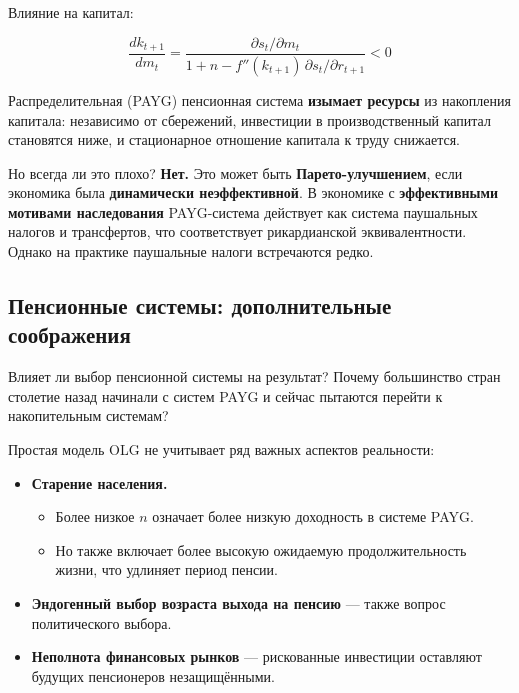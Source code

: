 \documentclass[10pt,a4paper]{article}
\begin{document}
Влияние на капитал:
\begin{formulabox}
\begin{equation}
\frac{dk_{t+1}}{dm_t} = \frac{\partial s_t/\partial m_t}{1+n-f''(k_{t+1})\,\partial s_t/\partial r_{t+1}} < 0 \tag{4.37}
\end{equation}
\end{formulabox}

\begin{intuition}
Распределительная (PAYG) пенсионная система \textbf{изымает ресурсы} из накопления капитала: независимо от сбережений, инвестиции в производственный капитал становятся ниже, и стационарное отношение капитала к труду снижается.

Но всегда ли это плохо? \textbf{Нет.} Это может быть \textbf{Парето-улучшением}, если экономика была \textbf{динамически неэффективной}. В экономике с \textbf{эффективными мотивами наследования} PAYG-система действует как система паушальных налогов и трансфертов, что соответствует рикардианской эквивалентности. Однако на практике паушальные налоги встречаются редко.
\end{intuition}

\subsection{Пенсионные системы: дополнительные соображения}

Влияет ли выбор пенсионной системы на результат? Почему большинство стран столетие назад начинали с систем PAYG и сейчас пытаются перейти к накопительным системам?

Простая модель OLG не учитывает ряд важных аспектов реальности:
\begin{itemize}[leftmargin=1.3em]
\item \textbf{Старение населения.}
  \begin{itemize}[leftmargin=1.3em]
  \item Более низкое $n$ означает более низкую доходность в системе PAYG.
  \item Но также включает более высокую ожидаемую продолжительность жизни, что удлиняет период пенсии.
  \end{itemize}
\item \textbf{Эндогенный выбор возраста выхода на пенсию} — также вопрос политического выбора.
\item \textbf{Неполнота финансовых рынков} — рискованные инвестиции оставляют будущих пенсионеров незащищёнными.
\end{itemize}
\end{document}
